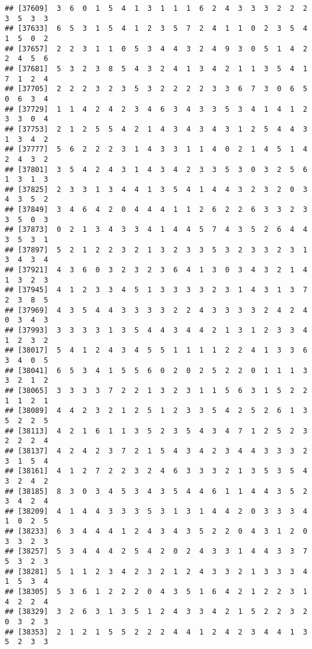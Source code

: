 \documentclass[
]{article}
\begin{document}
\begin{verbatim}
## [37609]  3  6  0  1  5  4  1  3  1  1  1  6  2  4  3  3  3  2  2  2  3  5  3  3
## [37633]  6  5  3  1  5  4  1  2  3  5  7  2  4  1  1  0  2  3  5  4  1  5  0  2
## [37657]  2  2  3  1  1  0  5  3  4  4  3  2  4  9  3  0  5  1  4  2  2  4  5  6
## [37681]  5  3  2  3  8  5  4  3  2  4  1  3  4  2  1  1  3  5  4  1  7  1  2  4
## [37705]  2  2  2  3  2  3  5  3  2  2  2  2  3  3  6  7  3  0  6  5  0  6  3  4
## [37729]  1  1  4  2  4  2  3  4  6  3  4  3  3  5  3  4  1  4  1  2  3  3  0  4
## [37753]  2  1  2  5  5  4  2  1  4  3  4  3  4  3  1  2  5  4  4  3  1  3  4  2
## [37777]  5  6  2  2  2  3  1  4  3  3  1  1  4  0  2  1  4  5  1  4  2  4  3  2
## [37801]  3  5  4  2  4  3  1  4  3  4  2  3  3  5  3  0  3  2  5  6  1  3  1  3
## [37825]  2  3  3  1  3  4  4  1  3  5  4  1  4  4  3  2  3  2  0  3  4  3  5  2
## [37849]  3  4  6  4  2  0  4  4  4  1  1  2  6  2  2  6  3  3  2  3  3  5  0  3
## [37873]  0  2  1  3  4  3  3  4  1  4  4  5  7  4  3  5  2  6  4  4  3  5  3  1
## [37897]  5  2  1  2  2  3  2  1  3  2  3  3  5  3  2  3  3  2  3  1  3  4  3  4
## [37921]  4  3  6  0  3  2  3  2  3  6  4  1  3  0  3  4  3  2  1  4  1  3  2  3
## [37945]  4  1  2  3  3  4  5  1  3  3  3  3  2  3  1  4  3  1  3  7  2  3  8  5
## [37969]  4  3  5  4  4  3  3  3  3  2  2  4  3  3  3  3  2  4  2  4  0  3  4  3
## [37993]  3  3  3  3  1  3  5  4  4  3  4  4  2  1  3  1  2  3  3  4  1  2  3  2
## [38017]  5  4  1  2  4  3  4  5  5  1  1  1  1  2  2  4  1  3  3  6  3  4  0  5
## [38041]  6  5  3  4  1  5  5  6  0  2  0  2  5  2  2  0  1  1  1  3  3  2  1  2
## [38065]  3  3  3  3  7  2  2  1  3  2  3  1  1  5  6  3  1  5  2  2  1  1  2  1
## [38089]  4  4  2  3  2  1  2  5  1  2  3  3  5  4  2  5  2  6  1  3  5  2  2  5
## [38113]  4  2  1  6  1  1  3  5  2  3  5  4  3  4  7  1  2  5  2  3  2  2  2  4
## [38137]  4  2  4  2  3  7  2  1  5  4  3  4  2  3  4  4  3  3  3  2  3  1  5  4
## [38161]  4  1  2  7  2  2  3  2  4  6  3  3  3  2  1  3  5  3  5  4  3  2  4  2
## [38185]  8  3  0  3  4  5  3  4  3  5  4  4  6  1  1  4  4  3  5  2  3  4  2  4
## [38209]  4  1  4  4  3  3  3  5  3  1  3  1  4  4  2  0  3  3  3  4  1  0  2  5
## [38233]  6  3  4  4  4  1  2  4  3  4  3  5  2  2  0  4  3  1  2  0  3  3  2  3
## [38257]  5  3  4  4  4  2  5  4  2  0  2  4  3  3  1  4  4  3  3  7  5  3  2  3
## [38281]  5  1  1  2  3  4  2  3  2  1  2  4  3  3  2  1  3  3  3  4  1  5  3  4
## [38305]  5  3  6  1  2  2  2  0  4  3  5  1  6  4  2  1  2  2  3  1  4  2  2  4
## [38329]  3  2  6  3  1  3  5  1  2  4  3  3  4  2  1  5  2  2  3  2  0  3  2  3
## [38353]  2  1  2  1  5  5  2  2  2  4  4  1  2  4  2  3  4  4  1  3  5  2  3  3

\end{verbatim}
\end{document}
